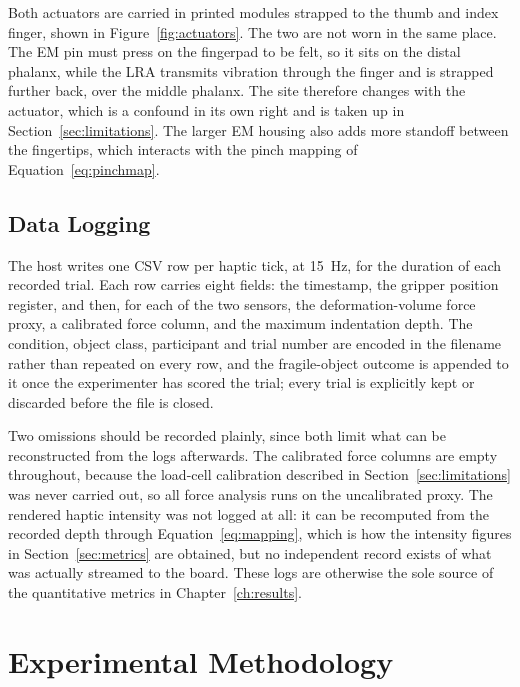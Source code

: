 \documentclass[12pt, a4paper, twoside, openright]{report}
\begin{document}
Both actuators are carried in printed modules strapped to the thumb and index
finger, shown in Figure~\ref{fig:actuators}. The two are not worn in the same
place. The EM pin must press on the fingerpad to be felt, so it sits on the
distal phalanx, while the LRA transmits vibration through the finger and is
strapped further back, over the middle phalanx. The site therefore changes with
the actuator, which is a confound in its own right and is taken up in
Section~\ref{sec:limitations}. The larger EM housing also adds more standoff
between the fingertips, which interacts with the pinch mapping of
Equation~\eqref{eq:pinchmap}.

\section{Data Logging}
\label{sec:logging-arch}

The host writes one CSV row per haptic tick, at \SI{15}{\hertz}, for the
duration of each recorded trial. Each row carries eight fields: the timestamp,
the gripper position register, and then, for each of the two sensors, the
deformation-volume force proxy, a calibrated force column, and the maximum
indentation depth. The condition, object class, participant and trial number
are encoded in the filename rather than repeated on every row, and the
fragile-object outcome is appended to it once the experimenter has scored the
trial; every trial is explicitly kept or discarded before the file is closed.

Two omissions should be recorded plainly, since both limit what can be
reconstructed from the logs afterwards. The calibrated force columns are empty
throughout, because the load-cell calibration described in
Section~\ref{sec:limitations} was never carried out, so all force analysis runs
on the uncalibrated proxy. The rendered haptic intensity was not logged at all:
it can be recomputed from the recorded depth through
Equation~\eqref{eq:mapping}, which is how the intensity figures in
Section~\ref{sec:metrics} are obtained, but no independent record exists of
what was actually streamed to the board. These logs are otherwise the sole
source of the quantitative metrics in Chapter~\ref{ch:results}.

\chapter{Experimental Methodology}
\label{ch:methodology}
\end{document}
